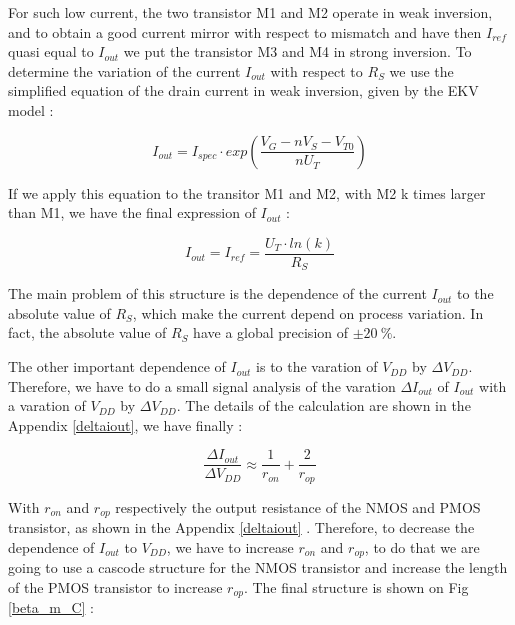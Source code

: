 \documentclass[11pt,a4paper]{report}
\begin{document}
For such low current, the two transistor M1 and M2 operate in weak inversion, and to obtain a good current mirror with respect to mismatch and have then $I_{ref}$ quasi equal to $I_{out}$ we put the transistor M3 and M4 in strong inversion. 
To determine the variation of the current $I_{out}$ with respect to $R_S$ we use the simplified equation of the drain current in weak inversion, given by the EKV model : 

\begin{equation}
  I_{out} = I_{spec} \cdot exp \left( \frac{V_G - n V_S - V_{T0}}{n U_T}\right)
  \label{WI}
\end{equation}

If we apply this equation to the transitor M1 and M2, with M2 k times larger than M1, we have the final expression of $I_{out}$ :

\begin{equation}
  I_{out} = I_{ref} = \frac{U_T \cdot ln(k)}{R_S}
\end{equation}

The main problem of this structure is the dependence of the current $I_{out}$ to the absolute value of $R_S$, which make the current depend on process variation. In fact, the absolute value of $R_S$ have a global precision of $\pm 20~\%$.

The other important dependence of $I_{out}$ is to the varation of $V_{DD}$ by $\Delta V_{DD}$. Therefore, we have to do a small signal analysis of the varation $\Delta I_{out}$ of $I_{out}$ with a varation of $V_{DD}$ by $\Delta V_{DD}$. The details of the calculation are shown in the Appendix \ref{deltaiout}, we have finally :

\begin{equation}
  \frac{\Delta I_{out}}{\Delta V_{DD}} \approx \frac{1}{r_{on}} + \frac{2}{r_{op}}
\end{equation} 

With $r_{on}$ and $r_{op}$ respectively the output resistance of the NMOS and PMOS transistor, as shown in the Appendix \ref{deltaiout} . Therefore, to decrease the dependence of $I_{out}$ to $V_{DD}$, we have to increase $r_{on}$ and $r_{op}$, to do that we are going to use a cascode structure for the NMOS transistor and increase the length of the PMOS transistor to increase $r_{op}$. The final structure is shown on Fig \ref{beta_m_C} :
\end{document}

